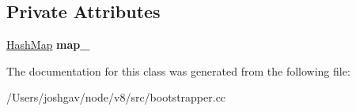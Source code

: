 \subsection*{Private Attributes}
\begin{DoxyCompactItemize}
\item 
\hyperlink{classv8_1_1internal_1_1_template_hash_map_impl}{Hash\+Map} {\bfseries map\+\_\+}\hypertarget{classv8_1_1internal_1_1_b_a_s_e___e_m_b_e_d_d_e_d_1_1_extension_states_aba7e86f31d128930ff5732f71556bd31}{}\label{classv8_1_1internal_1_1_b_a_s_e___e_m_b_e_d_d_e_d_1_1_extension_states_aba7e86f31d128930ff5732f71556bd31}

\end{DoxyCompactItemize}


The documentation for this class was generated from the following file\+:\begin{DoxyCompactItemize}
\item 
/\+Users/joshgav/node/v8/src/bootstrapper.\+cc\end{DoxyCompactItemize}
